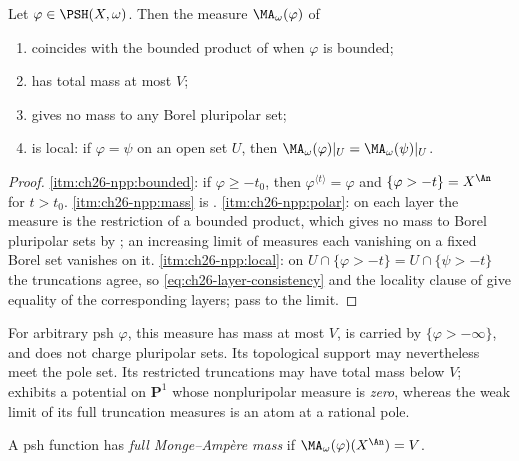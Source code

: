 \begin{proposition}
\label{prop:ch26-npp-basic}
Let $\varphi\in\PSH(X,\omega)$.  Then the measure
$\MA_\omega(\varphi)$ of 
\begin{enumerate}
\item\label{itm:ch26-npp:bounded}
 coincides with the bounded product of  when
 $\varphi$ is bounded;
\item\label{itm:ch26-npp:mass}
 has total mass at most $V$;
\item\label{itm:ch26-npp:polar}
 gives no mass to any Borel pluripolar set;
\item\label{itm:ch26-npp:local}
 is local: if $\varphi=\psi$ on an open set $U$, then
 $\MA_\omega(\varphi)|_U=\MA_\omega(\psi)|_U$.
\end{enumerate}
\end{proposition}

\begin{proof}
\cref{itm:ch26-npp:bounded}: if $\varphi\geq-t_0$, then
$\varphi^{\langle t\rangle}=\varphi$ and $\{\varphi>-t\}=X^{\An}$ for
$t>t_0$.  \cref{itm:ch26-npp:mass} is .
\cref{itm:ch26-npp:polar}: on each layer the measure is the restriction of a
bounded product, which gives no mass to Borel pluripolar sets by
; an increasing limit of measures each
vanishing on a fixed Borel set vanishes on it.
\cref{itm:ch26-npp:local}: on $U\cap\{\varphi>-t\}=U\cap\{\psi>-t\}$ the
truncations agree, so \eqref{eq:ch26-layer-consistency} and the locality
clause of  give equality of the
corresponding layers; pass to the limit.
\end{proof}

For arbitrary psh $\varphi$, this measure has mass at most $V$, is
carried by $\{\varphi>-\infty\}$, and does not charge pluripolar sets.
Its topological support may nevertheless meet the pole set.  Its restricted
truncations may have total mass below $V$;
 exhibits a potential on $\mathbf P^1$ whose
nonpluripolar measure is \emph{zero}, whereas the weak limit of its full
truncation measures is an atom at a rational pole.

\begin{definition}
\label{def:ch26-full-ma-mass}
A psh function has \emph{full Monge--Amp\`ere mass} if
$\MA_\omega(\varphi)(X^{\An})=V$.
\end{definition}

